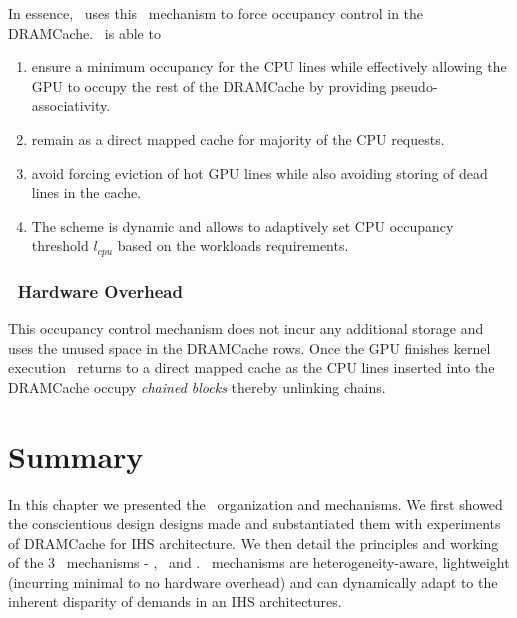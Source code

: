 \par In essence, \cachename\ uses this \chaining\ mechanism to force occupancy control in the DRAMCache. \chaining\ is able to 
\begin{enumerate}[label=(\roman*)]
	\item ensure a minimum occupancy for the CPU lines while effectively allowing the GPU to occupy the rest of the DRAMCache by providing pseudo-associativity.
	\item remain as a direct mapped cache for majority of the CPU requests.
	\item avoid forcing eviction of hot GPU lines while also avoiding storing of dead lines in the cache.
	\item The scheme is dynamic and allows to adaptively set CPU occupancy threshold \textit{$l_{cpu}$} based on the workloads requirements.
\end{enumerate}

\subsubsection{\chaining\ Hardware Overhead}
This occupancy control mechanism does not incur any additional storage and uses the unused space in the DRAMCache rows. Once the GPU finishes kernel execution \cachename\ returns to a direct mapped cache as the CPU lines inserted into the DRAMCache occupy \textit{chained blocks} thereby unlinking chains. 

\section{Summary}
In this chapter we presented the \cachename\ organization and mechanisms. We first showed the conscientious design designs made and substantiated them with experiments of DRAMCache for IHS architecture. We then detail the principles and working of the 3 \cachename\ mechanisms - \prioname, \bypassname\ and \chaining. \cachename\ mechanisms are heterogeneity-aware, lightweight (incurring minimal to no hardware overhead) and can dynamically adapt to the inherent disparity of demands in an IHS architectures.

